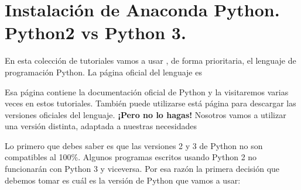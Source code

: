 \documentclass[10pt,a4paper]{article}\usepackage[]{graphicx}\usepackage[]{color}
\newcounter {cont01}
\begin{document}
\section{Instalación de Anaconda Python. Python2 vs Python 3.}
\label{tut02Py:sec:instalacionAnaconda}

En esta colección de tutoriales vamos a usar , de forma prioritaria, el lenguaje de programación Python. La página oficial del lenguaje es
\begin{center}
\end{center}
Esa página contiene la documentación oficial de Python y la visitaremos varias veces en estos tutoriales. También puede utilizarse está página para descargar las versiones oficiales del lenguaje. {\bf ¡Pero no lo hagas!} Nosotros vamos a utilizar una versión distinta, adaptada a nuestras necesidades

Lo primero que debes saber es que las versiones 2 y 3 de Python no son compatibles al 100\%. Algunos programas escritos usando Python 2 no funcionarán con Python 3 y viceversa. Por esa razón la primera decisión que debemos tomar es cuál es la versión de Python que vamos a usar:

    \begin{center}
    \end{center}
\end{document}
